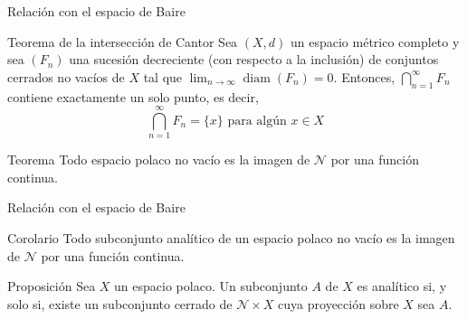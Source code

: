 \documentclass[8pt]{beamer}
\DeclareMathOperator{\diam}{diam} %
\begin{document}
\begin{frame}{Relación con el espacio de Baire}
    \begin{block}{Teorema de la intersección de Cantor}
        Sea $(X,d)$ un espacio métrico completo y sea $(F_n)$  una sucesión decreciente (con respecto a la inclusión) de conjuntos cerrados no vacíos de $X$ tal que $\displaystyle \lim_{n \to \infty} \diam (F_n) = 0 $. Entonces, $\displaystyle \bigcap_{n=1}^\infty F_n$ contiene exactamente un solo punto, es decir, 
    \begin{equation*}
        \bigcap_{n=1}^\infty F_n = \{x\} \text{ para algún } x \in X
    \end{equation*}
    \end{block}
    \begin{block}{Teorema}
        Todo espacio polaco no vacío es la imagen de $\mathcal{N}$ por una función continua.
    \end{block}
\end{frame}

\begin{frame}{Relación con el espacio de Baire}

    \begin{block}{Corolario}
        Todo subconjunto analítico de un espacio polaco no vacío es la imagen de $\mathcal{N}$ por una función continua.
    \end{block}
    \pause 
    \begin{block}{Proposición}
        Sea $X$ un espacio polaco. Un subconjunto $A$ de $X$ es analítico si, y solo si, existe un subconjunto cerrado de $\mathcal{N} \times X$ cuya proyección sobre $X$ sea $A$.
    \end{block}
\end{frame}
\end{document}
